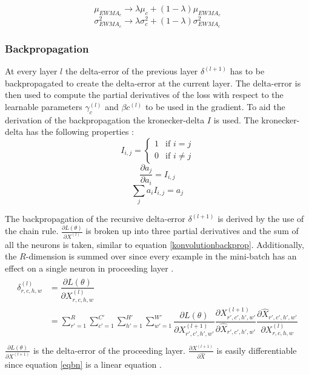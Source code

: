\documentclass[a4paper, twoside]{article}
\newcommand*{\pd}[2]{\ensuremath{\dfrac{\partial #1}{\partial #2}}}
\newcommand*{\inpd}[2]{\ensuremath{\frac{\partial #1}{\partial #2}}}
\begin{document}
\begin{equation}\label{eqewmamu}
\mu_{EWMA_c} \to \lambda \mu_c + (1-\lambda)\mu_{EWMA_c}
\end{equation}
\begin{equation}\label{eqewmasigma}
\sigma^2_{EWMA_c} \to \lambda \sigma^2_c + (1-\lambda)\sigma^2_{EWMA_c}
\end{equation}

\subsubsection{Backpropagation}
At every layer $l$ the delta-error of the previous layer $\delta^{(l+1)}$ has to be backpropagated to create the delta-error at the current layer. The delta-error is then used to compute the partial derivatives of the loss with respect to the learnable parameters $\gamma_{c}^{(l)}$ and $\beta{c}^{(l)}$ to be used in the gradient. To aid the derivation of the backpropagation the kronecker-delta $I$ is used. The kronecker-delta has the following properties \cite{webBN1} \cite{webBN2}: 
\begin{equation}\label{kroneckerdelta}
I_{i,j} = \begin{cases} 1 & \mbox{if } i = j \\ 0 & \mbox{if } i \neq j  \end{cases}
\end{equation}
\begin{equation}\label{kroneckerdeltaDERIVATIVE}
\pd{a_{j}}{a_i} = I_{i,j}
\end{equation}
\begin{equation}\label{kroneckerdeltaSUM}
\sum_j  a_i  I_{i,j} = a_j
\end{equation}

The backpropagation of the recursive delta-error $\delta^{(l+1)}$ is derived by the use of the chain rule. $\inpd{L(\theta)}{X^{(l)}}$ is broken up into three partial derivatives and the sum of all the neurons is taken, similar to equation \eqref{konvolutionbackprop}. Additionally, the $R$-dimension is summed over since every example in the mini-batch has an effect on a single neuron in proceeding layer \cite{webBN1} \cite{webBN2}. 
\begin{align}\label{BN_delta_error}
\begin{split}
	\delta^{(l)}_{r,c,h,w}
		& = \pd{L(\theta)}{X^{(l)}_{r,c,h,w}} \\
		& = \sum^{R }_{r'=1} \sum^{C' }_{c'=1} \sum^{H' }_{h'=1} \sum^{W' }_{w'=1} \pd{L(\theta)}{X^{(l+1)}_{r',c',h',w'}} \pd{X^{(l+1)}_{r',c',h',w'}}{\hat{X}_{r',c',h',w'}} \pd{\hat{X}_{r',c',h',w'}}{{X}^{(l)}_{r,c,h,w}}\\
\end{split}
\end{align}
$\inpd{L(\theta)}{X^{(l+1)}}$ is the delta-error of the proceeding layer. $\inpd{X^{(l+1)}}{\hat{X}}$ is easily differentiable since equation \eqref{eqbn} is a linear equation \cite{webBN1} \cite{webBN2}.
\end{document}
